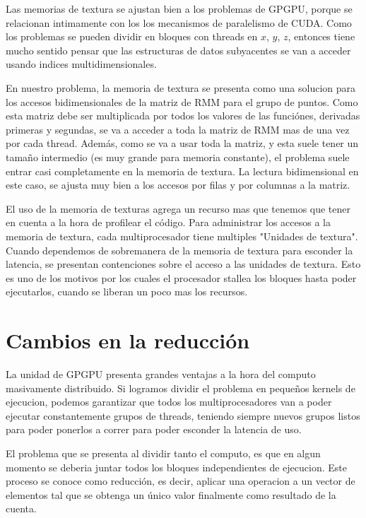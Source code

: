 Las memorias de textura se ajustan bien a los problemas de GPGPU, porque se relacionan
intimamente con los los mecanismos de paralelismo de CUDA. Como los problemas se pueden
dividir en bloques con threads en $x$, $y$, $z$, entonces tiene mucho sentido pensar
que las estructuras de datos subyacentes se van a acceder usando indices multidimensionales.

En nuestro problema, la memoria de textura se presenta como una solucion para
los accesos bidimensionales de la matriz de RMM para el grupo de puntos.
Como esta matriz debe ser multiplicada por todos los valores de las funci\'ones,
derivadas primeras y segundas, se va a acceder a toda la matriz de RMM mas de
una vez por cada thread. Adem\'as, como se va a usar toda la matriz, y esta suele
tener un tamaño intermedio (es muy grande para memoria constante), el problema
suele entrar casi completamente en la memoria de textura.
La lectura bidimensional en este caso, se ajusta muy bien a los accesos por filas
y por columnas a la matriz.

El uso de la memoria de texturas agrega un recurso mas que tenemos que tener en
cuenta a la hora de profilear el c\'odigo. Para administrar los accesos a
la memoria de textura, cada multiprocesador tiene multiples "Unidades de textura".
Cuando dependemos de sobremanera de la memoria de textura para esconder la latencia,
se presentan contenciones sobre el acceso a las unidades de textura. Esto es
uno de los motivos por los cuales el procesador stallea los bloques hasta poder
ejecutarlos, cuando se liberan un poco mas los recursos.


\section{Cambios en la reducci\'on}

La unidad de GPGPU presenta grandes ventajas a la hora del computo masivamente distribuido.
Si logramos dividir el problema en pequeños kernels de ejecucion, podemos garantizar que
todos los multiprocesadores van a poder ejecutar constantemente grupos de threads, teniendo
siempre nuevos grupos listos para poder ponerlos a correr para poder esconder la latencia de uso.

El problema que se presenta al dividir tanto el computo, es que en algun momento se deberia juntar
todos los bloques independientes de ejecucion. Este proceso se conoce como reducci\'on, es decir,
aplicar una operacion a un vector de elementos tal que se obtenga un \'unico valor finalmente
como resultado de la cuenta.

